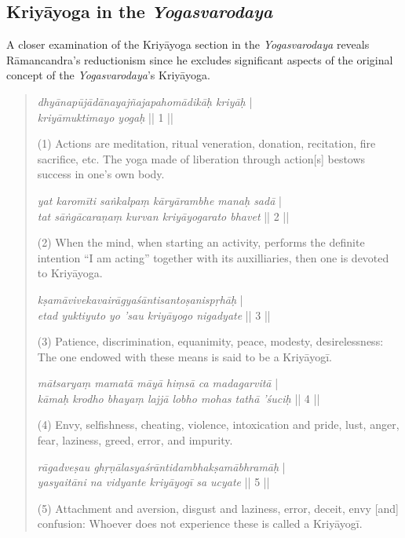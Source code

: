 \subsection{Kriyāyoga in the \textit{Yogasvarodaya}}
A closer examination of the Kriyāyoga section in the \textit{Yogasvarodaya} reveals Rāmancandra's reductionism since he excludes significant aspects of the original concept of the \textit{Yogasvarodaya}'s Kriyāyoga.


\begin{quote}
  \begin{ekdosis}
\textit{dhyānapūjādānayajñajapahomādikāḥ kriyāḥ} |\\
\textit{kriyāmuktimayo yogaḥ} || 1 ||

(1) Actions are meditation, ritual veneration, donation, recitation, fire sacrifice, etc. 
The yoga made of liberation through action[s] bestows success in one's own body. 

\textit{yat karomīti saṅkalpaṃ kāryārambhe manaḥ sadā} |\\
\textit{tat sāṅgācaraṇaṃ kurvan kriyāyogarato bhavet} || 2 ||

(2) When the mind, when starting an activity, performs the definite intention ``I am acting''
together with its auxilliaries, then one is devoted to Kriyāyoga. 

\textit{kṣamāvivekavairāgyaśāntisantoṣanispṛhāḥ} |\\
\textit{etad yuktiyuto yo 'sau kriyāyogo nigadyate} || 3 ||

(3) Patience, discrimination, equanimity, peace, modesty, desirelessness:
The one endowed with these means is said to be a Kriyāyogī.

\textit{mātsaryaṃ mamatā māyā hiṃsā ca madagarvitā} |\\
\textit{kāmaḥ krodho bhayaṃ lajjā lobho mohas tathā 'śuciḥ} || 4 ||

(4) Envy, selfishness, cheating, violence, intoxication and pride,
lust, anger, fear, laziness, greed, error, and impurity.

\textit{rāgadveṣau ghṛṇālasyaśrāntidambhakṣamābhramāḥ} |\\
\textit{yasyaitāni na vidyante kriyāyogī sa ucyate} || 5 ||

(5) Attachment and aversion, disgust and laziness, error, deceit, envy [and] confusion:
Whoever does not experience these is called a Kriyāyogī.


\end{ekdosis}
\end{quote}

